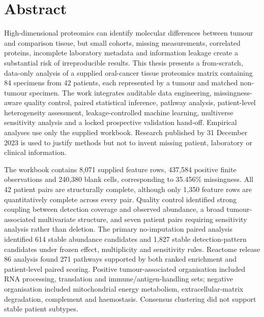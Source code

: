 \chapter*{Abstract}
\label{chap:abstract}

High-dimensional proteomics can identify molecular differences between tumour and comparison tissue, but small cohorts, missing measurements, correlated proteins, incomplete laboratory metadata and information leakage create a substantial risk of irreproducible results. This thesis presents a from-scratch, data-only analysis of a supplied oral-cancer tissue proteomics matrix containing 84 specimens from 42 patients, each represented by a tumour and matched non-tumour specimen. The work integrates auditable data engineering, missingness-aware quality control, paired statistical inference, pathway analysis, patient-level heterogeneity assessment, leakage-controlled machine learning, multiverse sensitivity analysis and a locked prospective validation hand-off. Empirical analyses use only the supplied workbook. Research published by 31 December 2023 is used to justify methods but not to invent missing patient, laboratory or clinical information.

The workbook contains 8,071 supplied feature rows, 437,584 positive finite observations and 240,380 blank cells, corresponding to 35.456\% missingness. All 42 patient pairs are structurally complete, although only 1,350 feature rows are quantitatively complete across every pair. Quality control identified strong coupling between detection coverage and observed abundance, a broad tumour-associated multivariate structure, and seven patient pairs requiring sensitivity analysis rather than deletion. The primary no-imputation paired analysis identified 614 stable abundance candidates and 1,827 stable detection-pattern candidates under frozen effect, multiplicity and sensitivity rules. Reactome release 86 analysis found 271 pathways supported by both ranked enrichment and patient-level paired scoring. Positive tumour-associated organisation included RNA processing, translation and immune/antigen-handling sets; negative organisation included mitochondrial energy metabolism, extracellular-matrix degradation, complement and haemostasis. Consensus clustering did not support stable patient subtypes.

